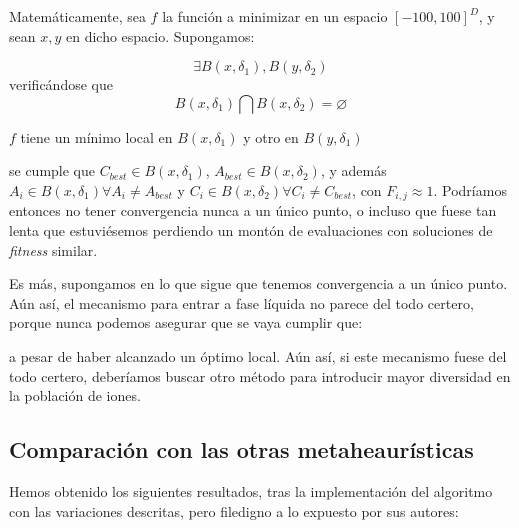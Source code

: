 \documentclass[a4paper,11pt]{article}
\let\emptyset\varnothing
\begin{document}
  Matemáticamente, sea $f$ la función a minimizar en un espacio $[-100,100]^D$, y sean $x,y$ en dicho espacio. Supongamos:
  
  $$\exists B(x,\delta_1), B(y, \delta_2)$$ verificándose que $$B(x,\delta_1) \bigcap B(x,\delta_2) = \emptyset $$
  
  $f$ tiene un mínimo local en $B(x,\delta_1)$ y otro en $B(y,\delta_1)$
  
  se cumple que $C_{best}\in B(x,\delta_1)$, $A_{best}\in B(x,\delta_2)$, y además $A_i\in B(x,\delta_1) \forall A_i \neq A_{best}$ 
  y $C_i\in B(x,\delta_2) \forall C_i \neq C_{best}$, con $F_{i,j} \approx 1$. Podríamos entonces no tener convergencia
  nunca a un único punto, o incluso que fuese tan lenta que estuviésemos perdiendo un montón de evaluaciones con soluciones
  de \textit{fitness} similar.
  
  Es más, supongamos en lo que sigue que tenemos convergencia a un único punto. Aún así, el mecanismo para entrar
  a fase líquida no parece del todo certero, porque nunca podemos asegurar que se vaya  cumplir que:
  
  \small{\texttt{}}
  \normalsize
  
  a pesar de haber alcanzado un óptimo local. Aún así, si este mecanismo fuese del todo certero, deberíamos buscar otro método
  para introducir mayor diversidad en la población de iones.
 
 \subsection{Comparación con las otras metaheaurísticas}
 
 Hemos obtenido los siguientes resultados, tras la implementación del algoritmo con las variaciones descritas, pero filedigno
 a lo expuesto por sus autores:
 
\end{document}

